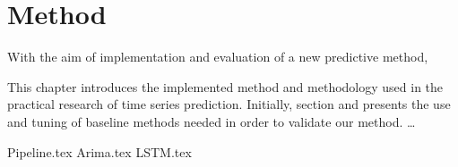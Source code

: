 \chapter{Method}
\label{cha:Method}

With the aim of implementation and evaluation of a new predictive method,

This chapter introduces the implemented method and methodology used in the practical research of time series prediction.
Initially, section  and  presents the use and tuning of baseline methods needed in order to validate our method.
\dots

{Pipeline.tex}
{Arima.tex}
{LSTM.tex}
